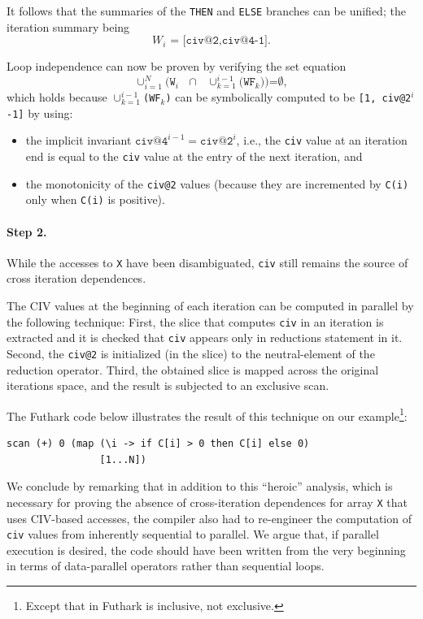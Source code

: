 It follows that the summaries of the \texttt{THEN} and \texttt{ELSE} branches
can be unified; the iteration summary being
\[
  \texttt{$W_i$~=~[civ@2,civ@4-1]}.
\]

Loop independence can now be proven by verifying the set equation
\[
  \texttt{$\cup_{i=1}^{N}$(W$_i$ $\cap$ $\cup_{k=1}^{i-1}$(WF$_k$))=$\emptyset$},
\]
which holds because \texttt{$\cup_{k=1}^{i-1}$(WF$_k$)} can be symbolically
computed to be \texttt{[1, civ@2$^i$-1]} by using:
\begin{itemize}
\item the implicit invariant
  $\texttt{civ@4}^{i-1}=\texttt{civ@2}^{i}$, i.e., the \texttt{civ}
  value at an iteration end is equal to the \texttt{civ} value at the
  entry of the next iteration, and
\item the monotonicity of the \texttt{civ@2} values (because they are
  incremented by \texttt{C(i)} only when \texttt{C(i)} is positive).
\end{itemize}

\paragraph{Step 2.} While the accesses to \texttt{X} have been
disambiguated, \texttt{civ} still remains the source of cross
iteration dependences.

The CIV values at the beginning of each iteration can be computed in
parallel by the following technique:
%
First, the slice that computes \texttt{civ} in an iteration is
extracted and it is checked that \texttt{civ} appears only in
reductions statement in it. Second, the \texttt{civ@2} is initialized
(in the slice) to the neutral-element of the reduction
operator. Third, the obtained slice is mapped across the original
iterations space, and the result is subjected to an exclusive scan.

The Futhark code below illustrates the result of this technique on our
example\footnote{Except that  in Futhark is inclusive, not
  exclusive.}:

\begin{lstlisting}
scan (+) 0 (map (\i -> if C[i] > 0 then C[i] else 0)
                [1...N])
\end{lstlisting}

We conclude by remarking that in addition to this ``heroic'' analysis,
which is necessary for proving the absence of cross-iteration
dependences for array \texttt{X} that uses CIV-based accesses, the
compiler also had to re-engineer the computation of \texttt{civ}
values from inherently sequential to parallel.  We argue that, if
parallel execution is desired, the code should have been written from
the very beginning in terms of data-parallel operators rather than
sequential loops.

